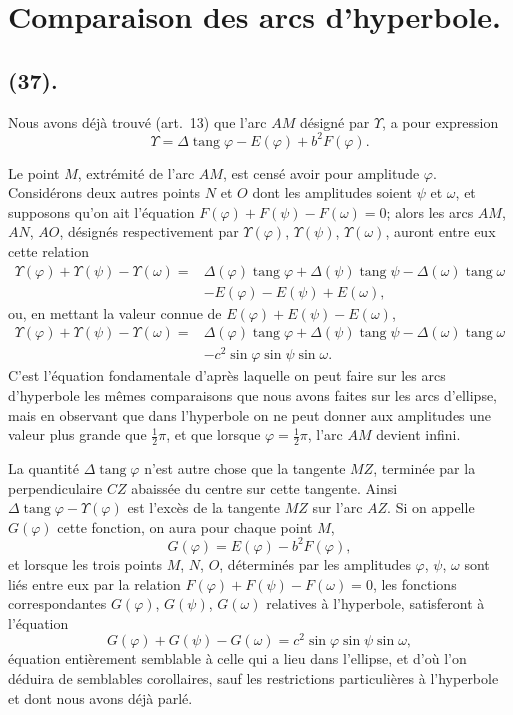 \documentclass{article}
\begin{document}
\section*{Comparaison des arcs d'hyperbole.}

\subsection*{(37).}

Nous avons déjà trouvé (art.~13) que l'arc $AM$ désigné par $\Upsilon$, a pour expression
\[ \Upsilon=\Delta\operatorname{tang}\varphi-E(\varphi)+b^{2}F(\varphi). \]

Le point $M$, extrémité de l'arc $AM$, est censé avoir pour amplitude $\varphi$. Considérons deux autres points $N$ et $O$ dont les amplitudes soient $\psi$ et $\omega$, et supposons qu'on ait l'équation $F(\varphi)+F(\psi)-F(\omega)=0$; alors les arcs $AM$, $AN$, $AO$, désignés respectivement par $\Upsilon(\varphi)$, $\Upsilon(\psi)$, $\Upsilon(\omega)$, auront entre eux cette relation
\[ \begin{aligned} \Upsilon(\varphi)+\Upsilon(\psi)-\Upsilon(\omega)={}&\Delta(\varphi)\operatorname{tang}\varphi+\Delta(\psi)\operatorname{tang}\psi-\Delta(\omega)\operatorname{tang}\omega\\ &-E(\varphi)-E(\psi)+E(\omega), \end{aligned} \]
ou, en mettant la valeur connue de $E(\varphi)+E(\psi)-E(\omega)$,
\[ \begin{aligned} \Upsilon(\varphi)+\Upsilon(\psi)-\Upsilon(\omega)={}&\Delta(\varphi)\operatorname{tang}\varphi+\Delta(\psi)\operatorname{tang}\psi-\Delta(\omega)\operatorname{tang}\omega\\ &-c^{2}\sin\varphi\sin\psi\sin\omega. \end{aligned} \]
C'est l'équation fondamentale d'après laquelle on peut faire sur les arcs d'hyperbole les mêmes comparaisons que nous avons faites sur les arcs d'ellipse, mais en observant que dans l'hyperbole on ne peut donner aux amplitudes une valeur plus grande que $\frac{1}{2}\pi$, et que lorsque $\varphi=\frac{1}{2}\pi$, l'arc $AM$ devient infini.

La quantité $\Delta\operatorname{tang}\varphi$ n'est autre chose que la tangente $MZ$, terminée par la perpendiculaire $CZ$ abaissée du centre sur cette tangente. Ainsi $\Delta\operatorname{tang}\varphi-\Upsilon(\varphi)$ est l'excès de la tangente $MZ$ sur l'arc $AZ$. Si on appelle $G(\varphi)$ cette fonction, on aura pour chaque point $M$,
\[ G(\varphi)=E(\varphi)-b^{2}F(\varphi), \]
et lorsque les trois points $M$, $N$, $O$, déterminés par les amplitudes $\varphi$, $\psi$, $\omega$ sont liés entre eux par la relation $F(\varphi)+F(\psi)-F(\omega)=0$, les fonctions correspondantes $G(\varphi)$, $G(\psi)$, $G(\omega)$ relatives à l'hyperbole, satisferont à l'équation
\[ G(\varphi)+G(\psi)-G(\omega)=c^{2}\sin\varphi\sin\psi\sin\omega, \]
équation entièrement semblable à celle qui a lieu dans l'ellipse, et d'où l'on déduira de semblables corollaires, sauf les restrictions particulières à l'hyperbole et dont nous avons déjà parlé.
\end{document}
